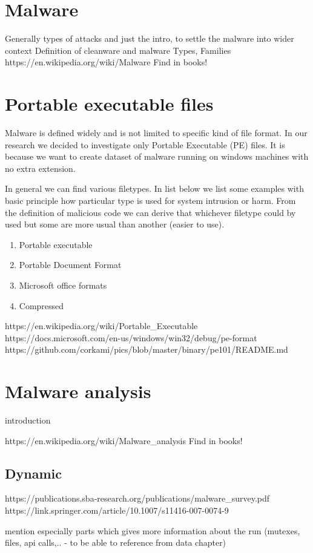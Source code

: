 \section{Malware}
Generally types of attacks and just the intro, to settle the malware into wider context
Definition of cleanware and malware
Types, Families
https://en.wikipedia.org/wiki/Malware
Find in books!

\section{Portable executable files}
Malware is defined widely and is not limited to specific kind of file format. In our research we decided to investigate only Portable Executable (PE) files. It is because we want to create dataset of malware running on windows machines with no extra extension. 

In general we can find various filetypes. In list below we list some examples with basic principle how particular type is used for system intrusion or harm. From the definition of malicious code we can derive that whichever filetype could by used but some are more usual than another (easier to use).
\begin{enumerate}
  \item Portable executable
  \item Portable Document Format
  \item Microsoft office formats
  \item Compressed
\end{enumerate}

https://en.wikipedia.org/wiki/Portable_Executable
https://docs.microsoft.com/en-us/windows/win32/debug/pe-format
https://github.com/corkami/pics/blob/master/binary/pe101/README.md

\section{Malware analysis}
introduction

https://en.wikipedia.org/wiki/Malware_analysis
Find in books!

\subsection{Dynamic}
https://publications.sba-research.org/publications/malware_survey.pdf
https://link.springer.com/article/10.1007/s11416-007-0074-9

mention especially parts which gives more information about the run (mutexes, files, api calls,.. - to be able to reference from data chapter)

